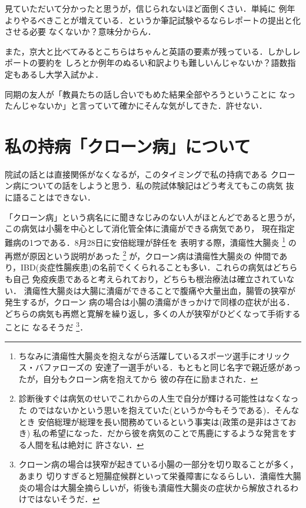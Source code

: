 \documentclass[dvipdfmx,uplatex]{jsarticle}
\begin{document}
見ていただいて分かったと思うが，信じられないほど面倒くさい．単純に
例年よりやるべきことが増えている．というか筆記試験やるならレポートの提出と化させる必要
なくないか？意味分からん．

また，京大と比べてみるとこちらはちゃんと英語の要素が残っている．しかしレポートの要約を
しろとか例年のぬるい和訳よりも難しいんじゃないか？語数指定もあるし大学入試かよ．

同期の友人が「教員たちの話し合いでもめた結果全部やろうということに
なったんじゃないか」と言っていて確かにそんな気がしてきた．許せない．

\section{私の持病「クローン病」について}
院試の話とは直接関係がなくなるが，このタイミングで私の持病である
クローン病についての話をしようと思う．私の院試体験記はどう考えてもこの病気
抜に語ることはできない．

「クローン病」という病名にに聞きなじみのない人がほとんどであると思うが，
この病気は小腸を中心として消化管全体に潰瘍ができる病気であり，
現在指定難病の1つである．8月28日に安倍総理が辞任を
表明する際，潰瘍性大腸炎
\footnote{ちなみに潰瘍性大腸炎を抱えながら活躍しているスポーツ選手にオリックス・バファローズの
安達了一選手がいる．もともと同じ名字で親近感があったが，自分もクローン病を抱えてから
彼の存在に励まされた．}
の再燃が原因という説明があった
\footnote{診断後すぐは病気のせいでこれからの人生で自分が輝ける可能性はなくなった
のではないかという思いを抱えていた(というか今もそうである)．そんなとき
安倍総理が総理を長い間務めているという事実は(政策の是非はさておき)
私の希望になった．だから彼を病気のことで馬鹿にするような発言をする人間を私は絶対に
許さない．}
が，クローン病は潰瘍性大腸炎の
仲間であり，IBD(炎症性腸疾患)の名前でくくられることも多い．これらの病気はどちらも自己
免疫疾患であると考えられており，どちらも根治療法は確立されていない．
潰瘍性大腸炎は大腸に潰瘍ができることで腹痛や大量出血，腸管の狭窄が発生するが，クローン
病の場合は小腸の潰瘍がきっかけで同様の症状が出る．
どちらの病気も再燃と寛解を繰り返し，多くの人が狭窄がひどくなって手術することに
なるそうだ
\footnote{クローン病の場合は狭窄が起きている小腸の一部分を切り取ることが多く，あまり
切りすぎると短腸症候群といって栄養障害になるらしい．潰瘍性大腸炎の場合は大腸全摘らしいが，術後も潰瘍性大腸炎の症状から解放されるわけではないそうだ．}．
\end{document}
